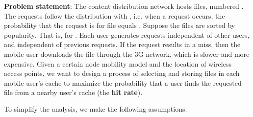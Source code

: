 \documentclass{sig-alternate}
\begin{document}
	\vspace{5mm}

	\textbf{Problem statement}: The content distribution network hosts  files, numbered . The requests follow the distribution  with , i.e. when a request occurs, the probability that the request is for file  equals . Suppose the files are sorted by popularity. That is,  for . Each user generates requests independent of other users, and independent of previous requests. If the request results in a miss, then the mobile user downloads the file through the 3G network, which is slower and more expensive. Given a certain node mobility model and the location of wireless access points, we want to design a process of selecting and storing files in each mobile user's cache to maximize the probability that a user finds the requested file from a nearby user's cache (the \textbf{hit rate}).

\vspace{3mm}

	To simplify the analysis, we make the following assumptions:
	
\end{document}
